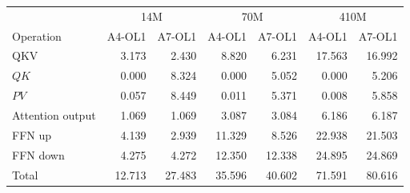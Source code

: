 \begin{tabular}{@{}lrrrrrr@{}}
\toprule
& \multicolumn{2}{c}{14M} & \multicolumn{2}{c}{70M} & \multicolumn{2}{c}{410M} \\ Operation & A4-OL1 & A7-OL1 & A4-OL1 & A7-OL1 & A4-OL1 & A7-OL1 \\
\midrule
QKV & 3.173 & 2.430 & 8.820 & 6.231 & 17.563 & 16.992 \\
$QK$ & 0.000 & 8.324 & 0.000 & 5.052 & 0.000 & 5.206 \\
$PV$ & 0.057 & 8.449 & 0.011 & 5.371 & 0.008 & 5.858 \\
Attention output & 1.069 & 1.069 & 3.087 & 3.084 & 6.186 & 6.187 \\
FFN up & 4.139 & 2.939 & 11.329 & 8.526 & 22.938 & 21.503 \\
FFN down & 4.275 & 4.272 & 12.350 & 12.338 & 24.895 & 24.869 \\
Total & 12.713 & 27.483 & 35.596 & 40.602 & 71.591 & 80.616 \\
\bottomrule
\end{tabular}
